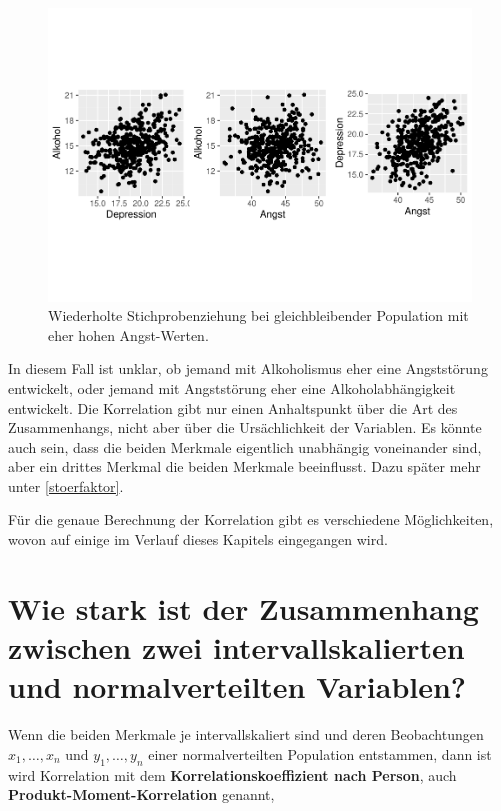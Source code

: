 \documentclass[
]{book}
\theoremstyle{definition}
\theoremstyle{definition}
\theoremstyle{definition}
\theoremstyle{definition}
\theoremstyle{remark}
\begin{document}
\begin{figure}

{\centering \includegraphics{aps_statistik1_files/figure-latex/exm-depression-alkohol-angst-scatter-1} 

}

\caption{Wiederholte Stichprobenziehung bei gleichbleibender Population mit eher hohen Angst-Werten.}\label{fig:exm-depression-alkohol-angst-scatter}
\end{figure}

In diesem Fall ist unklar, ob jemand mit Alkoholismus eher eine Angststörung entwickelt, oder jemand mit Angststörung eher eine Alkoholabhängigkeit entwickelt. Die Korrelation gibt nur einen Anhaltspunkt über die Art des Zusammenhangs, nicht aber über die Ursächlichkeit der Variablen. Es könnte auch sein, dass die beiden Merkmale eigentlich unabhängig voneinander sind, aber ein drittes Merkmal die beiden Merkmale beeinflusst. Dazu später mehr unter \ref{stoerfaktor}.

Für die genaue Berechnung der Korrelation gibt es verschiedene Möglichkeiten, wovon auf einige im Verlauf dieses Kapitels eingegangen wird.

\section{Wie stark ist der Zusammenhang zwischen zwei intervallskalierten und normalverteilten Variablen?}\label{wie-stark-ist-der-zusammenhang-zwischen-zwei-intervallskalierten-und-normalverteilten-variablen}

Wenn die beiden Merkmale je intervallskaliert sind und deren Beobachtungen \(x_1, \ldots, x_n\) und \(y_1,\ldots, y_n\) einer normalverteilten Population entstammen, dann ist wird Korrelation mit dem \label{customdef-pearson-korrelation}{\textbf{Korrelationskoeffizient nach Person}}, auch \label{customdef-podukt-moment-korrelation}{\textbf{Produkt-Moment-Korrelation}} genannt,
\end{document}
